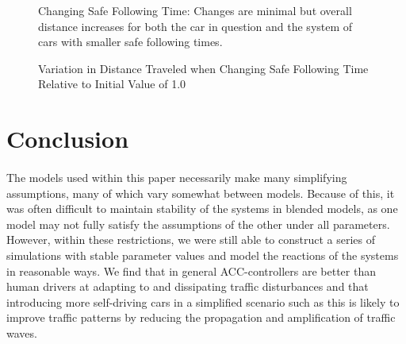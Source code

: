 \documentclass[12pt]{article}
\begin{document}
\begin{figure}[H]
  \centering
  \caption{Changing Safe Following Time: Changes are minimal but overall distance increases for both the car in question and the system of cars with smaller safe following times.}
\end{figure}

\begin{figure}[H]
  \centering
  \caption{Variation in Distance Traveled when Changing Safe Following Time Relative to Initial Value of 1.0}
\end{figure}

\section{Conclusion}
\paragraph{}The models used within this paper necessarily make many simplifying assumptions, many of which vary somewhat between models. Because of this, it was often difficult to maintain stability of the systems in blended models, as one model may not fully satisfy the assumptions of the other under all parameters. However, within these restrictions, we were still able to construct a series of simulations with stable parameter values and model the reactions of the systems in reasonable ways. We find that in general ACC-controllers are better than human drivers at adapting to and dissipating traffic disturbances and that introducing more self-driving cars in a simplified scenario such as this is likely to improve traffic patterns by reducing the propagation and amplification of traffic waves. 
\end{document}
